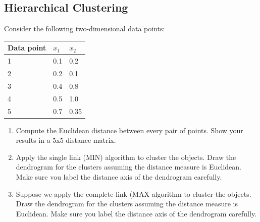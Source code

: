 \documentclass{article}
\begin{document}
\subsection*{Hierarchical Clustering}

Consider the following two-dimensional data points:

\begin{table}[h]
    \begin{tabular}{|l|l|l|}
    \hline
    Data point & $x_1$ & $x_2$ \\ \hline
    1          & 0.1   & 0.2   \\ \hline
    2          & 0.2   & 0.1   \\ \hline
    3          & 0.4   & 0.8   \\ \hline
    4          & 0.5   & 1.0   \\ \hline
    5          & 0.7   & 0.35  \\ \hline
    \end{tabular}
    \centering
\end{table}

\begin{enumerate}
    \item Compute the Euclidean distance between every pair of points. Show your results in a 5x5 distance matrix.
    \item Apply the single link (MIN) algorithm to cluster the objects. Draw the dendrogram for the clusters assuming the distance measure is Euclidean. Make sure vou label the distance axis of the dendrogram carefully.
    \item Suppose we apply the complete link (MAX algorithm to cluster the objects.
    Draw the dendrogram for the clusters assuming the distance measure is Euclidean. Make sure you label the distance axis of the dendrogram carefully.
\end{enumerate}
\end{document}
